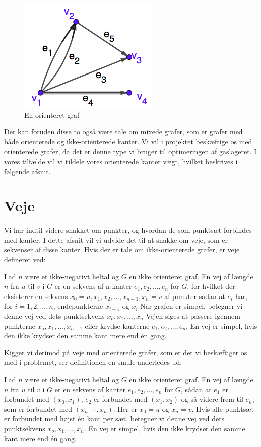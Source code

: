 \begin{figure}[H]
\centering
\includegraphics[scale=0.5]{fig/img/orienteret_graf.png}
\caption{En orienteret graf}
\label{fig:orienteret}
\end{figure}
Der kan foruden disse to også være tale om mixede grafer, som er grafer med både orienterede og ikke-orienterede kanter. Vi vil i projektet beskæftige os med orienterede grafer, da det er denne type vi bruger til optimeringen af gaslageret. I vores tilfælde vil vi tildele vores orienterede kanter vægt, hvilket beskrives i følgende afsnit.




\section{Veje}
Vi har indtil videre snakket om punkter, og hvordan de som punktsæt forbindes med kanter. I dette afsnit vil vi udvide det til at snakke om veje, som er sekvenser af disse kanter. Hvis der er tale om ikke-orienterede grafer, er veje defineret ved:
\begin{definition}
[Veje] 
Lad $n$ være et ikke-negativt heltal og $G$ en ikke orienteret graf. En vej af længde $n$ fra $u$ til $v$ i $G$ er en sekvens af n kanter $e_{1},e_{2},...,e_{n}$ for $G$, for hvilket der eksisterer en sekvens $x_{0}=u,x_{1},x_{2},...,x_{n-1},x_{n}=v$ af punkter sådan at $e_{i}$ har, for $i=1,2,...,n$, endepunkterne $x_{i-1}$ og $x_{i}$ Når grafen er simpel, betegner vi denne  vej ved dets punktsekvens $x_{o},x_{1},...,x_{n}$ Vejen siges at passere igennem punkterne $x_{o},x_{1},...,x_{n-1}$ eller krydse kanterne $e_{1},e_{2},...,e_{n}$. En vej er simpel, hvis den ikke krydser den samme kant mere end én gang.
\end{definition}
Kigger vi derimod på veje med orienterede grafer, som er det vi beskæftiger os med i problemet, ser definitionen en smule anderledes ud:
\begin{definition}
[Veje] 
Lad $n$ være et ikke-negativt heltal og $G$ en ikke orienteret graf. En vej af længde $n$ fra $u$ til $v$ i $G$ er en sekvens af kanter $e_{1},e_{2},...,e_{n}$ for $G$, sådan at $e_{1}$ er forbundet med $(x_{0},x_{1})$, $e_{2}$ er forbundet med $(x_{1},x_{2})$ og så videre frem til $e_{n}$, som er forbundet med $(x_{n-1},x_{n})$. Her er $x_{0}=u$ og $x_{n}=v$. Hvis alle punktsæt er forbundet med højst én kant per sæt, betegner vi denne  vej ved dets punktsekvens $x_{o},x_{1},...,x_{n}$. En vej er simpel, hvis den ikke krydser den samme kant mere end én gang.
\end{definition}






